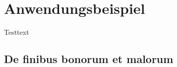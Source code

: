 %
%
%
%
\section{Anwendungsbeispiel
\label{openfoam:section:teil3}}
Testtext

\subsection{De finibus bonorum et malorum
\label{openfoam:subsection:malorum}}



